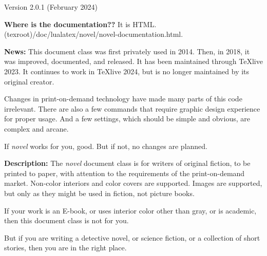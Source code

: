 \documentclass{novel} %
\begin{document}
\thispagestyle{empty}
\begin{ChapterStart}[8]
\vspace{\nbs} %
\vspace{\nbs}
{\centering Version 2.0.1 (February 2024)\par}
\end{ChapterStart}

\textbf{Where is the documentation??} It is HTML.\\
(texroot)/doc/lualatex/novel/novel-documentation.html.

\scenebreak

\textbf{News:} This document class was first privately used in 2014.
Then, in 2018, it was improved, documented, and released. It has been
maintained through TeXlive 2023. It continues to work in TeXlive 2024, but is
no longer maintained by its original creator.\par
Changes in print-on-demand technology have made many parts of this code
irrelevant. There are also a few commands that require graphic design
experience for proper usage. And a few settings, which should be simple and
obvious, are complex and arcane.\par
If \emph{novel} works for you, good. But if not, no changes are planned.

\scenebreak

\textbf{Description:} The \emph{novel} document class is for writers of
original fiction, to be printed to paper, with attention to the requirements
of the print-on-demand market. Non-color interiors and color covers are
supported. Images are supported, but only as they might be used in fiction,
not picture books.

If your work is an E-book, or uses interior color other than gray, or is
academic, then this document class is not for you. 

But if you are writing a detective novel, or science fiction, or a collection
of short stories, then you are in the right place.

\makeatletter\nocle@rtoendtrue\makeatother %
\end{document}
